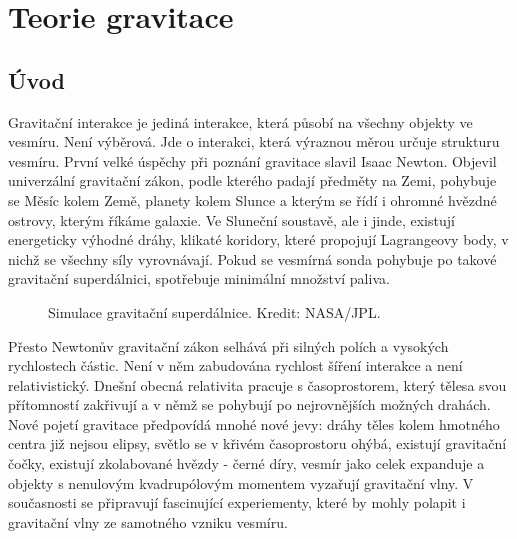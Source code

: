 \setchaptertoc
\chapter{Teorie gravitace}\label{fyz:chap_fey_gravity}

  \section{Úvod}
    Gravitační interakce je jediná interakce, která působí na všechny objekty ve vesmíru. Není
    výběrová. Jde o interakci, která výraznou měrou určuje strukturu vesmíru. První velké úspěchy
    při poznání gravitace slavil Isaac Newton. Objevil univerzální gravitační zákon, podle kterého
    padají předměty na Zemi, pohybuje se Měsíc kolem Země, planety kolem Slunce a kterým se řídí i
    ohromné hvězdné ostrovy, kterým říkáme galaxie. Ve Sluneční soustavě, ale i jinde, existují
    energeticky výhodné dráhy, klikaté koridory, které propojují Lagrangeovy body, v nichž se
    všechny síly vyrovnávají. Pokud se vesmírná sonda pohybuje po takové gravitační superdálnici,
    spotřebuje minimální množství paliva.

    \begin{figure}[ht!] %
      \centering
      \caption{Simulace gravitační superdálnice. Kredit: NASA/JPL. }
      \label{fyz:fig0886}
    \end{figure}

    Přesto Newtonův gravitační zákon selhává při silných polích a vysokých rychlostech částic. Není
    v něm zabudována rychlost šíření interakce a není relativistický. Dnešní obecná relativita
    pracuje s časoprostorem, který tělesa svou přítomností zakřivují a v němž se pohybují po
    nejrovnějších možných drahách. Nové pojetí gravitace předpovídá mnohé nové jevy: dráhy těles
    kolem hmotného centra již nejsou elipsy, světlo se v křivém časoprostoru ohýbá, existují
    gravitační čočky, existují zkolabované hvězdy - černé díry, vesmír jako celek expanduje a
    objekty s nenulovým kvadrupólovým momentem vyzařují gravitační vlny. V současnosti se připravují
    fascinující experiementy, které by mohly polapit i gravitační vlny ze samotného vzniku vesmíru.

